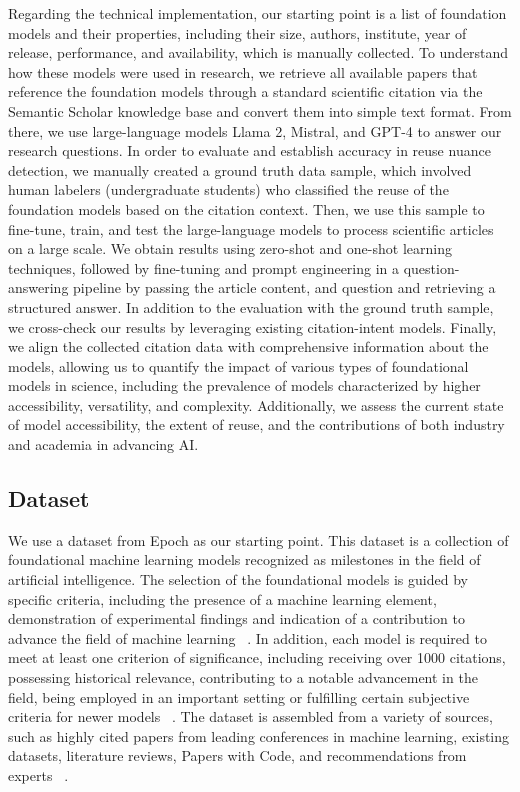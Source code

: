 \documentclass[acmsmall,authorversion]{acmart}
\begin{document}
Regarding the technical implementation, our starting point is a list of foundation models and their properties, including their size, authors, institute, year of release, performance, and availability, which is manually collected. To understand how these models were used in research, we retrieve all available papers that reference the foundation models through a standard scientific citation via the Semantic Scholar knowledge base and convert them into simple text format. From there, we use large-language models Llama 2, Mistral, and GPT-4 to answer our research questions. In order to evaluate and establish accuracy in reuse nuance detection, we manually created a ground truth data sample, which involved human labelers (undergraduate students) who classified the reuse of the foundation models based on the citation context. Then, we use this sample to fine-tune, train, and test the large-language models to process scientific articles on a large scale. We obtain results using zero-shot and one-shot learning techniques, followed by fine-tuning and prompt engineering in a question-answering pipeline by passing the article content, and question and retrieving a structured answer. In addition to the evaluation with the ground truth sample, we cross-check our results by leveraging existing citation-intent models. Finally, we align the collected citation data with comprehensive information about the models, allowing us to quantify the impact of various types of foundational models in science, including the prevalence of models characterized by higher accessibility, versatility, and complexity. Additionally, we assess the current state of model accessibility, the extent of reuse, and the contributions of both industry and academia in advancing AI.

\subsection{Dataset}

We use a dataset from Epoch as our starting point. This dataset is a collection of foundational machine learning models recognized as milestones in the field of artificial intelligence. The selection of the foundational models is guided by specific criteria, including the presence of a machine learning element, demonstration of experimental findings and indication of a contribution to advance the field of machine learning ~\cite{sevilla2022compute}. In addition, each model is required to meet at least one criterion of significance, including receiving over 1000 citations, possessing historical relevance, contributing to a notable advancement in the field, being employed in an important setting or fulfilling certain subjective criteria for newer models ~\cite{epoch2023pcdtrends}. The dataset is assembled from a variety of sources, such as highly cited papers from leading conferences in machine learning, existing datasets, literature reviews, Papers with Code, and recommendations from experts ~\cite{sevilla2022compute}. 
\end{document}
